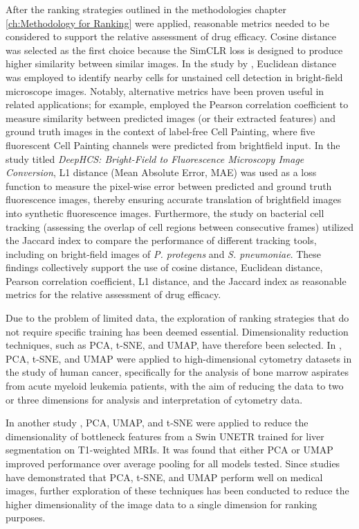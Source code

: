 After the ranking strategies outlined in the methodologies chapter  \ref{ch:Methodology for Ranking} were applied, reasonable metrics needed to be considered to support the relative assessment of drug efficacy.  Cosine distance was selected as the first choice because the SimCLR loss is designed to produce higher similarity between similar images. In the study by \cite{Mualla2013ACD}, Euclidean distance was employed to identify nearby cells for unstained cell detection in bright-field microscope images. Notably, alternative metrics have been proven useful in related applications; for example, \cite{CrossZamirski2022LabelFree} employed the Pearson correlation coefficient to measure similarity between predicted images (or their extracted features) and ground truth images in the context of label-free Cell Painting, where five fluorescent Cell Painting channels were predicted from brightfield input. In the study \cite{Lee2018DeepHCS} titled \textit{DeepHCS: Bright-Field to Fluorescence Microscopy Image Conversion}, L1 distance (Mean Absolute Error, MAE) was used as a loss function to measure the pixel-wise error between predicted and ground truth fluorescence images, thereby ensuring accurate translation of brightfield images into synthetic fluorescence images. Furthermore, the study \cite{Todorov2023STrack} on bacterial cell tracking (assessing the overlap of cell regions between consecutive frames) utilized the Jaccard index to compare the performance of different tracking tools, including on bright-field images of \textit{P. protegens} and \textit{S. pneumoniae}. These findings collectively support the use of cosine distance, Euclidean distance, Pearson correlation coefficient, L1 distance, and the Jaccard index as reasonable metrics for the relative assessment of drug efficacy.

Due to the problem of limited data, the exploration of ranking strategies that do not require specific training has been deemed essential. Dimensionality reduction techniques, such as PCA, t-SNE, and UMAP, have therefore been selected. In \cite{keyes2020cancerprimer}, PCA, t-SNE, and UMAP were applied to high-dimensional cytometry datasets in the study of human cancer, specifically for the analysis of bone marrow aspirates from acute myeloid leukemia patients, with the aim of reducing the data to two or three dimensions for analysis and interpretation of cytometry data.

In another study \cite{melba:2024:020:woodland}, PCA, UMAP, and t-SNE were applied to reduce the dimensionality of bottleneck features from a Swin UNETR trained for liver segmentation on T1-weighted MRIs. It was found that either PCA or UMAP improved performance over average pooling for all models tested. Since studies have demonstrated that PCA, t-SNE, and UMAP perform well on medical images, further exploration of these techniques has been conducted to reduce the higher dimensionality of the image data to a single dimension for ranking purposes.